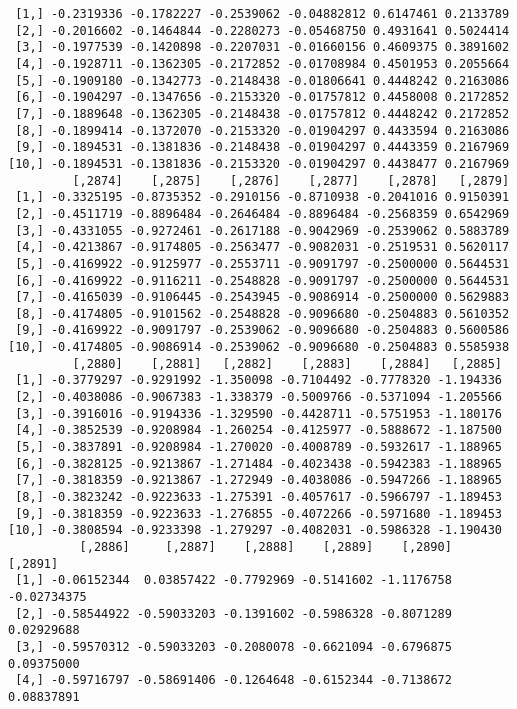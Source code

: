 \documentclass[
  letterpaper,
  DIV=11,
  numbers=noendperiod]{scrreprt}
\begin{document}
\begin{verbatim}
 [1,] -0.2319336 -0.1782227 -0.2539062 -0.04882812 0.6147461 0.2133789
 [2,] -0.2016602 -0.1464844 -0.2280273 -0.05468750 0.4931641 0.5024414
 [3,] -0.1977539 -0.1420898 -0.2207031 -0.01660156 0.4609375 0.3891602
 [4,] -0.1928711 -0.1362305 -0.2172852 -0.01708984 0.4501953 0.2055664
 [5,] -0.1909180 -0.1342773 -0.2148438 -0.01806641 0.4448242 0.2163086
 [6,] -0.1904297 -0.1347656 -0.2153320 -0.01757812 0.4458008 0.2172852
 [7,] -0.1889648 -0.1362305 -0.2148438 -0.01757812 0.4448242 0.2172852
 [8,] -0.1899414 -0.1372070 -0.2153320 -0.01904297 0.4433594 0.2163086
 [9,] -0.1894531 -0.1381836 -0.2148438 -0.01904297 0.4443359 0.2167969
[10,] -0.1894531 -0.1381836 -0.2153320 -0.01904297 0.4438477 0.2167969
         [,2874]    [,2875]    [,2876]    [,2877]    [,2878]   [,2879]
 [1,] -0.3325195 -0.8735352 -0.2910156 -0.8710938 -0.2041016 0.9150391
 [2,] -0.4511719 -0.8896484 -0.2646484 -0.8896484 -0.2568359 0.6542969
 [3,] -0.4331055 -0.9272461 -0.2617188 -0.9042969 -0.2539062 0.5883789
 [4,] -0.4213867 -0.9174805 -0.2563477 -0.9082031 -0.2519531 0.5620117
 [5,] -0.4169922 -0.9125977 -0.2553711 -0.9091797 -0.2500000 0.5644531
 [6,] -0.4169922 -0.9116211 -0.2548828 -0.9091797 -0.2500000 0.5644531
 [7,] -0.4165039 -0.9106445 -0.2543945 -0.9086914 -0.2500000 0.5629883
 [8,] -0.4174805 -0.9101562 -0.2548828 -0.9096680 -0.2504883 0.5610352
 [9,] -0.4169922 -0.9091797 -0.2539062 -0.9096680 -0.2504883 0.5600586
[10,] -0.4174805 -0.9086914 -0.2539062 -0.9096680 -0.2504883 0.5585938
         [,2880]    [,2881]   [,2882]    [,2883]    [,2884]   [,2885]
 [1,] -0.3779297 -0.9291992 -1.350098 -0.7104492 -0.7778320 -1.194336
 [2,] -0.4038086 -0.9067383 -1.338379 -0.5009766 -0.5371094 -1.205566
 [3,] -0.3916016 -0.9194336 -1.329590 -0.4428711 -0.5751953 -1.180176
 [4,] -0.3852539 -0.9208984 -1.260254 -0.4125977 -0.5888672 -1.187500
 [5,] -0.3837891 -0.9208984 -1.270020 -0.4008789 -0.5932617 -1.188965
 [6,] -0.3828125 -0.9213867 -1.271484 -0.4023438 -0.5942383 -1.188965
 [7,] -0.3818359 -0.9213867 -1.272949 -0.4038086 -0.5947266 -1.188965
 [8,] -0.3823242 -0.9223633 -1.275391 -0.4057617 -0.5966797 -1.189453
 [9,] -0.3818359 -0.9223633 -1.276855 -0.4072266 -0.5971680 -1.189453
[10,] -0.3808594 -0.9233398 -1.279297 -0.4082031 -0.5986328 -1.190430
          [,2886]     [,2887]    [,2888]    [,2889]    [,2890]     [,2891]
 [1,] -0.06152344  0.03857422 -0.7792969 -0.5141602 -1.1176758 -0.02734375
 [2,] -0.58544922 -0.59033203 -0.1391602 -0.5986328 -0.8071289  0.02929688
 [3,] -0.59570312 -0.59033203 -0.2080078 -0.6621094 -0.6796875  0.09375000
 [4,] -0.59716797 -0.58691406 -0.1264648 -0.6152344 -0.7138672  0.08837891

\end{verbatim}
\end{document}
